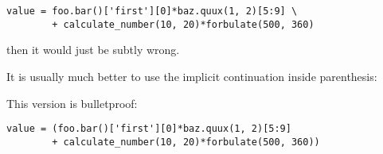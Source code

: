 \documentclass{howto}
\begin{document}
\begin{verbatim}
value = foo.bar()['first'][0]*baz.quux(1, 2)[5:9] \
        + calculate_number(10, 20)*forbulate(500, 360)
\end{verbatim}

then it would just be subtly wrong.

It is usually much better to use the implicit continuation inside parenthesis:

This version is bulletproof:

\begin{verbatim}
value = (foo.bar()['first'][0]*baz.quux(1, 2)[5:9] 
        + calculate_number(10, 20)*forbulate(500, 360))
\end{verbatim}
\end{document}
